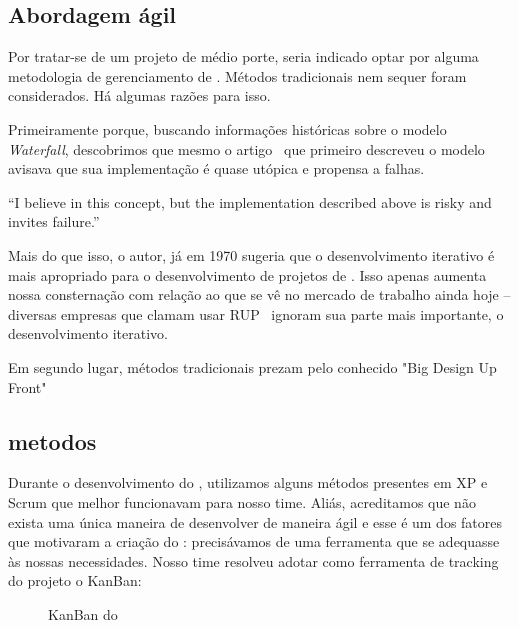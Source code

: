 \subsection{Abordagem ágil}

Por tratar-se de um projeto de médio porte, seria indicado optar por alguma metodologia de gerenciamento de \software. Métodos tradicionais nem sequer foram considerados. Há algumas razões para isso.

Primeiramente porque, buscando informações históricas sobre o modelo \textit{Waterfall}, descobrimos que mesmo o artigo~\cite{waterfall} que primeiro descreveu o modelo avisava que sua implementação é quase utópica e propensa a falhas.

``I believe in this concept, but the implementation described above is risky and invites failure.''

Mais do que isso, o autor, já em 1970 sugeria que o desenvolvimento iterativo é mais apropriado para o desenvolvimento de projetos de \software. Isso apenas aumenta nossa consternação com relação ao que se vê no mercado de trabalho ainda hoje -- diversas empresas que clamam usar RUP~\cite{rup} ignoram sua parte mais importante, o desenvolvimento iterativo.

Em segundo lugar, métodos tradicionais prezam pelo conhecido "Big Design Up Front" 

 

\subsection{metodos}

Durante o desenvolvimento do \calopsita, utilizamos alguns métodos presentes em XP e Scrum que melhor funcionavam para nosso time. Aliás, acreditamos que não exista uma única maneira de desenvolver \software de maneira ágil e esse é um dos fatores que motivaram a criação do \calopsita: precisávamos de uma ferramenta que se adequasse às nossas necessidades. Nosso time resolveu adotar como ferramenta de tracking do projeto o KanBan:

\begin{figure}[H]
  \centering
  \caption{KanBan do \calopsita}
\end{figure}

